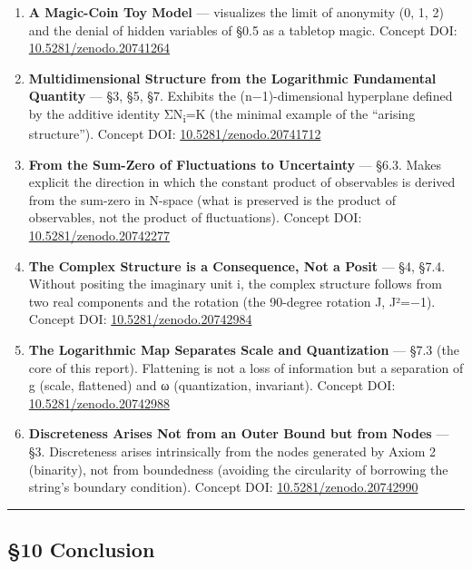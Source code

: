 \documentclass[11pt]{ltjsarticle}
\providecommand{\tightlist}{\setlength{\itemsep}{0pt}\setlength{\parskip}{0pt}}
\begin{document}
\begin{enumerate}
\def\labelenumi{\arabic{enumi}.}
\tightlist
\item
  \textbf{A Magic-Coin Toy Model} --- visualizes the limit of anonymity
  (0, 1, 2) and the denial of hidden variables of §0.5 as a tabletop
  magic. Concept DOI:
  \href{https://doi.org/10.5281/zenodo.20741264}{10.5281/zenodo.20741264}
\item
  \textbf{Multidimensional Structure from the Logarithmic Fundamental
  Quantity} --- §3, §5, §7. Exhibits the (n−1)-dimensional hyperplane
  defined by the additive identity ΣN\textsubscript{i}=K (the minimal example of the
  ``arising structure''). Concept DOI:
  \href{https://doi.org/10.5281/zenodo.20741712}{10.5281/zenodo.20741712}
\item
  \textbf{From the Sum-Zero of Fluctuations to Uncertainty} --- §6.3.
  Makes explicit the direction in which the constant product of
  observables is derived from the sum-zero in N-space (what is preserved
  is the product of observables, not the product of fluctuations).
  Concept DOI:
  \href{https://doi.org/10.5281/zenodo.20742277}{10.5281/zenodo.20742277}
\item
  \textbf{The Complex Structure is a Consequence, Not a Posit} --- §4,
  §7.4. Without positing the imaginary unit i, the complex structure
  follows from two real components and the rotation (the 90-degree
  rotation J, J²=−1). Concept DOI:
  \href{https://doi.org/10.5281/zenodo.20742984}{10.5281/zenodo.20742984}
\item
  \textbf{The Logarithmic Map Separates Scale and Quantization} --- §7.3
  (the core of this report). Flattening is not a loss of information but
  a separation of g (scale, flattened) and ω (quantization, invariant).
  Concept DOI:
  \href{https://doi.org/10.5281/zenodo.20742988}{10.5281/zenodo.20742988}
\item
  \textbf{Discreteness Arises Not from an Outer Bound but from Nodes}
  --- §3. Discreteness arises intrinsically from the nodes generated by
  Axiom 2 (binarity), not from boundedness (avoiding the circularity of
  borrowing the string's boundary condition). Concept DOI:
  \href{https://doi.org/10.5281/zenodo.20742990}{10.5281/zenodo.20742990}
\end{enumerate}

\begin{center}\rule{0.5\linewidth}{0.5pt}\end{center}

\subsection{§10 Conclusion}\label{conclusion}
\end{document}
